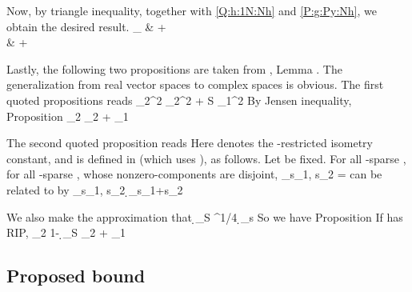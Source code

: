 Now, by triangle inequality, together with \eqref {Q:h:1N:Nh} and \eqref {P:g:Py:Nh}, we obtain the desired result.
%
 {
 _\infty
\leq &
+  \notag \\
%
\simeq & +  
}

Lastly, the following two propositions are taken from \cite {CaT07}, Lemma .
The generalization from real vector spaces to complex spaces is obvious.
The first quoted propositions reads
%
 {
 _2^2
\leq {} _2^2 +  {S}  _1^2 
}
%
By Jensen inequality,
%
\Result
{Proposition}
{
%
 {
 _2
\leq {} _2 +  {}  _1 
}
}

The second quoted proposition reads
%
%
Here  denotes the -restricted isometry constant, and is defined in \cite {Can05} (which uses \m {\th}), as follows.
Let  be fixed.
For all -sparse , for all -sparse , whose nonzero-components are disjoint,
%
 {
\tilde {\d} _{s_1, s_2}
= \inf {} 
}
%
 can be related to  by \cite {Can05}
 {
\tilde {\d} _{s_1, s_2}
\leq \d_{s_1+s_2} 
}

We also make the approximation that
%
 {
\d_{S}
\leq {}  ^{1/4} \d_{s} 
}
%
So we have
%
\Result
{Proposition}
{
If  has  RIP,
%
 {
 _2
\leq {} {1-  \d_{S}}  _2
+  { }  _1 
}
}


\subsection {Proposed bound}

